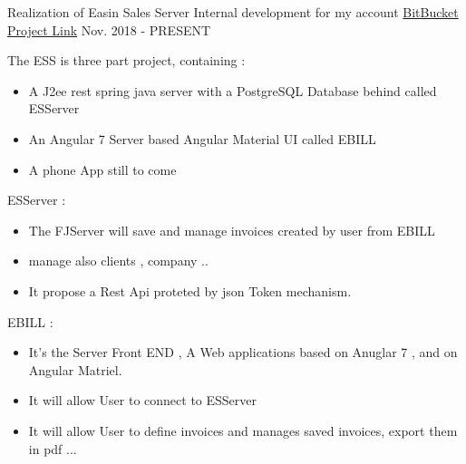 \begin{cventries}
\cventry
{Realization of Easin Sales Server } %
{ Internal development for my account } %
{ \href{https://bitbucket.org/account/user/easysoftin/projects/EAS}{BitBucket Project Link} }%
{Nov. 2018 - PRESENT} %
{ %
\begin{cvitems}
\item {The ESS is three part project, containing :}
\begin{itemize}
\item { A J2ee rest spring java server with a PostgreSQL Database behind called ESServer}
\item { An Angular 7 Server based Angular Material UI called EBILL }
\item { A phone App still to come}
\end{itemize}
\item {  ESServer : }
\begin{itemize}
\item{ The FJServer will save and manage invoices created by user from EBILL}
\item{ manage also clients , company ..}
\item{ It propose a Rest Api proteted by json Token mechanism.}
\end{itemize}
\item {EBILL :}
\begin{itemize}
\item {It's the Server Front END , A Web applications based on Anuglar 7 , and on Angular Matriel.}
\item { It will allow User to connect to ESServer}
\item { It will allow User to define invoices and manages saved invoices, export them in pdf ...}
\end{itemize}
\end{cvitems}
}



\end{cventries}

